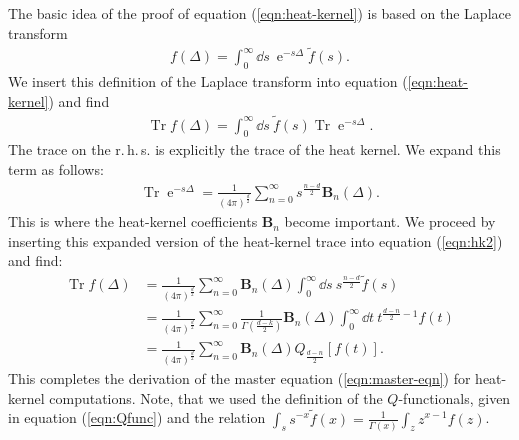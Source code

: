 The basic idea of the proof of equation (\ref{eqn:heat-kernel}) is based on the Laplace transform
\begin{align}
	f(\Delta) = \int_0^{\infty} \dd s \ \operatorname{e}^{-s\Delta}\tilde{f}(s).
\end{align}
We insert this definition of the Laplace transform into equation (\ref{eqn:heat-kernel}) and find
\begin{align}
	\operatorname{Tr} f(\Delta)=\int_{0}^{\infty} \dd s \ \tilde{f}(s) \operatorname{Tr} \operatorname{e}^{-s \Delta}.
\label{eqn:hk2}
\end{align}
The trace on the r.\,h.\,s. is explicitly the trace of the heat kernel. We expand this term as follows:
\begin{align}
	\operatorname{Tr} \operatorname{e}^{-s \Delta}=\frac{1}{(4 \pi)^{\frac{d}{2}}} \sum_{n=0}^{\infty} s^{\frac{n-d}{2}} \mathbf{B}_{n}(\Delta).
\end{align}
This is where the heat-kernel coefficients $\mathbf{B}_n$ become important. We proceed by inserting this expanded version of the heat-kernel trace into equation (\ref{eqn:hk2}) and find:
\begin{equation}
\begin{aligned} 
\operatorname{Tr} f(\Delta) &=\frac{1}{(4 \pi)^{\frac{d}{2}}} \sum_{n=0}^{\infty} \mathbf{B}_{n}(\Delta) \int_{0}^{\infty} \dd s \ s^{\frac{n-d}{2}} \tilde{f}(s) \\[10pt] 
&=\frac{1}{(4 \pi)^{\frac{d}{2}}} \sum_{n=0}^{\infty} \frac{1}{\Gamma\left(\frac{d-k}{2}\right)} \mathbf{B}_{n}(\Delta) \int_{0}^{\infty} \dd t \ t^{\frac{d-n}{2}-1} f(t) \\[10pt]
 &=\frac{1}{(4 \pi)^{\frac{d}{2}}} \sum_{n=0}^{\infty} \mathbf{B}_{n}(\Delta) Q_{\frac{d-n}{2}}[f(t)].
\end{aligned}
\end{equation}
This completes the derivation of the master equation (\ref{eqn:master-eqn}) for heat-kernel computations. Note, that we used the definition of the $Q$-functionals, given in equation (\ref{eqn:Qfunc}) and the relation $\int_{s} s^{-x} \tilde{f}(x)=\frac{1}{\Gamma(x)} \int_{z} z^{x-1} f(z)$.



